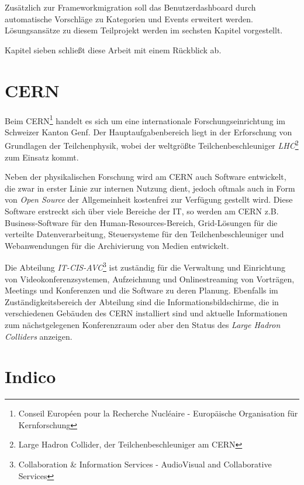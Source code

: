 Zusätzlich zur Frameworkmigration soll das Benutzerdashboard durch automatische Vorschläge zu
Kategorien und Events erweitert werden. Lösungsansätze zu diesem Teilprojekt werden im sechsten
Kapitel vorgestellt.

Kapitel sieben schließt diese Arbeit mit einem Rückblick ab.


\section{CERN}

Beim CERN\footnote{Conseil Européen pour la Recherche Nucléaire - Europäische Organisation für
Kernforschung} handelt es sich um eine internationale Forschungseinrichtung im Schweizer Kanton
Genf. Der Hauptaufgabenbereich liegt in der Erforschung von Grundlagen der Teilchenphysik, wobei der
weltgrößte Teilchenbeschleuniger \emph{LHC}\footnote{Large Hadron Collider, der
Teilchenbeschleuniger am CERN} zum Einsatz kommt.

Neben der physikalischen Forschung wird am CERN auch Software entwickelt, die zwar in erster
Linie zur internen Nutzung dient, jedoch oftmals auch in Form von \emph{Open Source} der
Allgemeinheit kostenfrei zur Verfügung gestellt wird. Diese Software erstreckt sich über viele
Bereiche der IT, so werden am CERN z.B. Business-Software für den Human-Resources-Bereich,
Grid-Lösungen für die verteilte Datenverarbeitung, Steuersysteme für den Teilchenbeschleuniger und
Webanwendungen für die Archivierung von Medien entwickelt.

Die Abteilung \emph{IT-CIS-AVC}\footnote{Collaboration \& Information Services - AudioVisual and
Collaborative Services} ist zuständig für die Verwaltung und Einrichtung von Videokonferenzsystemen,
Aufzeichnung und Onlinestreaming von Vorträgen, Meetings und Konferenzen und die Software zu deren
Planung. Ebenfalls im Zuständigkeitsbereich der Abteilung sind die Informationsbildschirme, die in
verschiedenen Gebäuden des CERN installiert sind und aktuelle Informationen zum nächstgelegenen
Konferenzraum oder aber den Status des \emph{Large Hadron Colliders} anzeigen.


\section{Indico}

